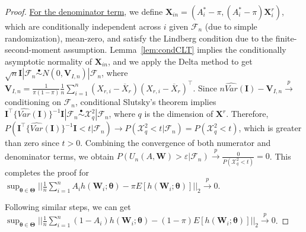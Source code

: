 \documentclass[12pt]{article}
\newcommand{\bX}{\boldsymbol{X}}
\newcommand{\bW}{\boldsymbol{W}}
\newcommand{\bI}{\boldsymbol{I}}
\newcommand{\bV}{\boldsymbol{V}}
\newcommand{\bzero}{\boldsymbol{0}}
\newcommand{\btheta}{\boldsymbol{\theta}}
\newcommand{\bTheta}{\boldsymbol{\Theta}}
\newcommand{\bfV}{\mathbf{V}}
\begin{document}
\begin{proof}
\underline{For the denominator term}, we define $\bX_{in} = (A_i^*-\pi, (A_i^*-\pi)\bX_i^r)$, which are conditionally independent across $i$ given $\mathcal{F}_n$ (due to simple randomization), mean-zero, and satisfy the Lindberg condition due to the finite-second-moment assumption. Lemma~\ref{lem:condCLT} implies the conditionally asymptotic normality of $\bX_{in}$, and we apply the Delta method to get $\sqrt{n}\bI |\mathcal{F}_n \overset{\bullet}{\sim} N(0, \bV_{I,n}) |\mathcal{F}_n$, where $\bV_{I,n} = \frac{1}{\pi(1-\pi)} \frac{1}{n}\sum_{i=1}^n (X_{r,i}-\overline X_r)(X_{r,i}-\overline X_r)^\top$. Since $n\widehat{Var}(\bI) - \bV_{I,n} \xrightarrow{p}$ conditioning on $\mathcal{F}_n$, conditional Slutsky's theorem implies $\bI^\top \{\widehat{Var}(\bI)\}^{-1} \bI|\mathcal{F}_n\overset{\bullet}{\sim}\mathcal{X}^2_q|\mathcal{F}_n$, where $q$ is the dimension of $\bX^r$. Therefore, $P(\bI^\top \{\widehat{Var}(\bI)\}^{-1} \bI < t|\mathcal{F}_n) \rightarrow P(\mathcal{X}^2_q < t|\mathcal{F}_n) = P(\mathcal{X}^2_q < t)$, which is greater than zero since $t > 0$. Combining the convergence of both numerator and denominator terms, we obtain $P\left(U_n(A,\bW) > \varepsilon | \mathcal{F}_n\right) \xrightarrow{p} \frac{0}{P(\mathcal{X}^2_q < t)} = 0$. This completes the proof for $\sup_{\btheta \in \bTheta}||\frac{1}{n} \sum_{i=1}^n A_i h(\bW_i;\btheta) - \pi E[h(\bW_i;\btheta)] ||_2 \xrightarrow{p} 0$.




Following similar steps, we can get $\sup_{\btheta \in \bTheta}||\frac{1}{n} \sum_{i=1}^n (1-A_i) h(\bW_i;\btheta) - (1-\pi) E[h(\bW_i;\btheta)] ||_2 \xrightarrow{p} 0$.
\end{proof}
\end{document}
